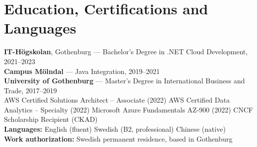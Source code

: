 \documentclass[a4paper,10pt]{article}
\begin{document}
\section*{Education, Certifications and Languages}
\textbf{IT-H\"ogskolan}, Gothenburg --- Bachelor's Degree in .NET Cloud Development, 2021--2023\\
\textbf{Campus M\"olndal} --- Java Integration, 2019--2021\\
\textbf{University of Gothenburg} --- Master's Degree in International Business and Trade, 2017--2019\\[3pt]
AWS Certified Solutions Architect -- Associate (2022) \textbar{} AWS Certified Data Analytics -- Specialty (2022) \textbar{} Microsoft Azure Fundamentals AZ-900 (2022) \textbar{} CNCF Scholarship Recipient (CKAD)
\\[3pt]
\textbf{Languages:} English (fluent) \textbar{} Swedish (B2, professional) \textbar{} Chinese (native)\\
\textbf{Work authorization:} Swedish permanent residence, based in Gothenburg
\end{document}
